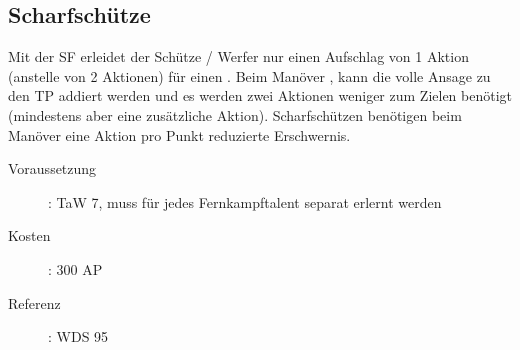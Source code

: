 \subsection{Scharfschütze}
\label{sf.scharfschuetze}
Mit der SF  erleidet der Schütze / Werfer nur einen Aufschlag von 1 Aktion (anstelle von 2 Aktionen) für einen .
Beim Manöver , kann die volle Ansage zu den TP addiert werden und es werden zwei Aktionen weniger zum Zielen benötigt (mindestens aber eine zusätzliche Aktion).
Scharfschützen benötigen beim Manöver  eine Aktion pro Punkt reduzierte Erschwernis.
\begin{description}
    \item[Voraussetzung]:
        TaW  7, muss für jedes Fernkampftalent separat erlernt werden
    \item [Kosten]:
        300 AP
    \item [Referenz]:
        WDS 95
\end{description}
